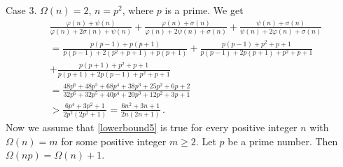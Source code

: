\documentclass[12pt]{article}
\begin{document}
Case 3. \; $\Omega(n)=2$, $n=p^2$, where $p$ is a prime. We get
\begin{align*}
&\frac{\varphi(n)+\psi(n)}{\varphi(n)+2\sigma(n)+\psi(n)}+\frac{\varphi(n)+\sigma(n)}{\varphi(n)+2\psi(n)+\sigma(n)}+\frac{\psi(n)+\sigma(n)}{\psi(n)+2\varphi(n)+\sigma(n)}\\
&=\frac{p(p-1)+p(p+1)}{p(p-1)+2(p^2+p+1)+p(p+1)}+\frac{p(p-1)+p^2+p+1}{p(p-1)+2p(p+1)+p^2+p+1}\\
&+\frac{p(p+1)+p^2+p+1}{p(p+1)+2p(p-1)+p^2+p+1}\\
&=\frac{48p^6+48p^5+68p^4+38p^3+25p^2+6p+2}{32p^6+32p^5+40p^4+20p^3+12p^2+3p+1}\\
&>\frac{6p^4+3p^2+1}{2p^2(2p^2+1)}=\frac{6n^2+3n+1}{2n(2n+1)}\,.
\end{align*}
Now we assume that \eqref{lowerbound5} is true for every positive integer $n$ with $\Omega(n)=m$ for some positive integer $m\geq2$.
Let $p$ be a prime number. Then $\Omega(np)=\Omega(n)+1$.
\end{document}
